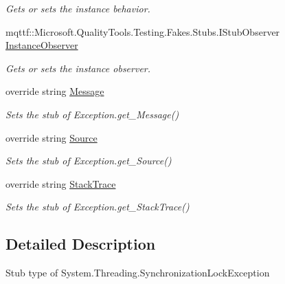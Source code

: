 \begin{DoxyCompactItemize}
\begin{DoxyCompactList}\small\item\em Gets or sets the instance behavior.\end{DoxyCompactList}\item 
mqttf\-::\-Microsoft.\-Quality\-Tools.\-Testing.\-Fakes.\-Stubs.\-I\-Stub\-Observer \hyperlink{class_system_1_1_threading_1_1_fakes_1_1_stub_synchronization_lock_exception_aa9a5aba3e4bfeeec2be85f916f3fa2df}{Instance\-Observer}
\begin{DoxyCompactList}\small\item\em Gets or sets the instance observer.\end{DoxyCompactList}\item 
override string \hyperlink{class_system_1_1_threading_1_1_fakes_1_1_stub_synchronization_lock_exception_ab726ffa8d5c290f0e7c3ea7e3245242e}{Message}
\begin{DoxyCompactList}\small\item\em Sets the stub of Exception.\-get\-\_\-\-Message()\end{DoxyCompactList}\item 
override string \hyperlink{class_system_1_1_threading_1_1_fakes_1_1_stub_synchronization_lock_exception_a1309954fb5ad892b124965eb5963d263}{Source}
\begin{DoxyCompactList}\small\item\em Sets the stub of Exception.\-get\-\_\-\-Source()\end{DoxyCompactList}\item 
override string \hyperlink{class_system_1_1_threading_1_1_fakes_1_1_stub_synchronization_lock_exception_abc4aa794b78074f50b56e0edbd8adc58}{Stack\-Trace}
\begin{DoxyCompactList}\small\item\em Sets the stub of Exception.\-get\-\_\-\-Stack\-Trace()\end{DoxyCompactList}\end{DoxyCompactItemize}


\subsection{Detailed Description}
Stub type of System.\-Threading.\-Synchronization\-Lock\-Exception



